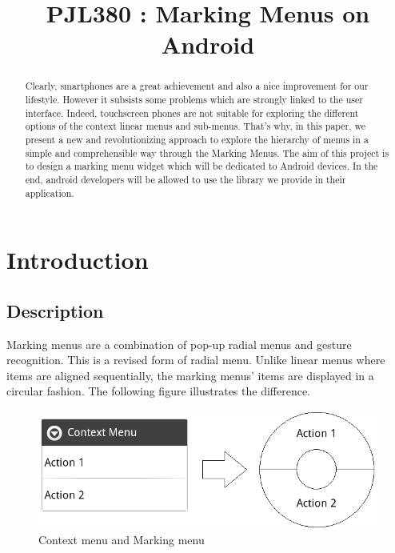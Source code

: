 \documentclass[conference]{IEEEtran}
\begin{document}
\title{PJL380 : Marking Menus on Android}

\author{
\and
{}
}

\maketitle

\IEEEpeerreviewmaketitle

\begin{abstract}
Clearly, smartphones are a great achievement and also a nice improvement for our lifestyle. However it subsists some problems which are strongly linked to the user interface. Indeed, touchscreen phones are not suitable for exploring the different options of the context linear menus and sub-menus. That's why, in this paper, we present a new and revolutionizing approach to explore the hierarchy of menus in a simple and comprehensible way through the Marking Menus. The aim of this project is to design a marking menu widget which will be dedicated to Android devices. In the end, android developers will be allowed to use the library we provide in their application. 
\end{abstract}

\section{Introduction}
\subsection{Description}
Marking menus are a combination of pop-up radial menus and gesture recognition. This is a revised form of radial menu. Unlike linear menus where items are aligned sequentially, the marking menus' items are displayed in a circular fashion. The following figure illustrates the difference. 

\begin{figure}[!ht] 
		\centering
		\includegraphics[scale = 0.5]{figure1.png} %
		\caption{Context menu and Marking menu}
		\label{linear-marking_menus}
\end{figure}
\end{document}
